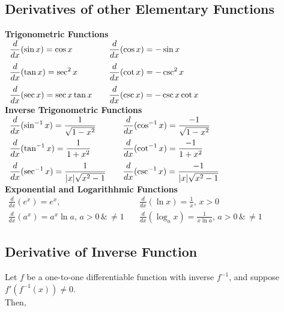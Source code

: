 \documentclass[11pt]{article}
\begin{document}
\subsection{Derivatives of other Elementary Functions}
\textbf{Trigonometric Functions}\\[.5em]
$
    \begin{array}{l@{\qquad}l}
        \displaystyle \frac{d}{dx}(\sin x) = \cos x & \displaystyle \frac{d}{dx}(\cos x) = -\sin x \\[10pt]
        \displaystyle \frac{d}{dx}(\tan x) = \sec^2 x & \displaystyle \frac{d}{dx}(\cot x) = -\csc^2 x \\[10pt]
        \displaystyle \frac{d}{dx}(\sec x) = \sec x \tan x & \displaystyle \frac{d}{dx}(\csc x) = -\csc x \cot x \\
    \end{array}
$\\[1.5em]
\textbf{Inverse Trigonometric Functions}\\[.5em]
$
    \begin{array}{l@{\qquad}l}
        \displaystyle \frac{d}{dx}(\sin^{-1} x) = \frac{1}{\sqrt{1 - x^2}} & \displaystyle \frac{d}{dx}(\cos^{-1} x) = \frac{-1}{\sqrt{1 - x^2}} \\[10pt]
        \displaystyle \frac{d}{dx}(\tan^{-1} x) = \frac{1}{1 + x^2} & \displaystyle \frac{d}{dx}(\cot^{-1} x) = \frac{-1}{1 + x^2} \\[10pt]
        \displaystyle \frac{d}{dx}(\sec^{-1} x) = \frac{1}{|x|\sqrt{x^2 - 1}} & \displaystyle \frac{d}{dx}(\csc^{-1} x) = \frac{-1}{|x|\sqrt{x^2 - 1}}
    \end{array}
$\\[1.5em]
\textbf{Exponential and Logarithhmic Functions}\\[.5em]
$
    \begin{array}{ll}
        \displaystyle \frac{d}{dx}(e^x) = e^x, & \displaystyle \frac{d}{dx}(\ln x) = \frac{1}{x},\,x>0\\[10pt]
        \displaystyle \frac{d}{dx}(a^x) = a^x \ln a,\,a>0 \,\&\,\neq 1 \quad & \displaystyle \frac{d}{dx}(\log_a x) = \frac{1}{x \ln a},\,a>0 \,\&\,\neq 1
    \end{array}
$
\subsection{Derivative of Inverse Function}
Let $f$ be a one-to-one differentiable function with inverse $f^{-1}$, and suppose $f'(f^{-1}(x)) \neq 0$. \\Then,
\end{document}
